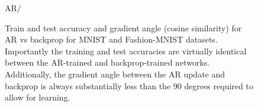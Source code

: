\begin{figure}
\hfil
{}\hfil AR/
\caption{Train and test accuracy and gradient angle (cosine similarity) for AR vs backprop for MNIST and Fashion-MNIST datasets. Importantly the training and test accuracies are virtually identical between the AR-trained and backprop-trained networks. Additionally, the gradient angle between the AR update and backprop is always substantially less than the 90 degrees required to allow for learning.}
\label{AR_mnist_results}
\end{figure}

